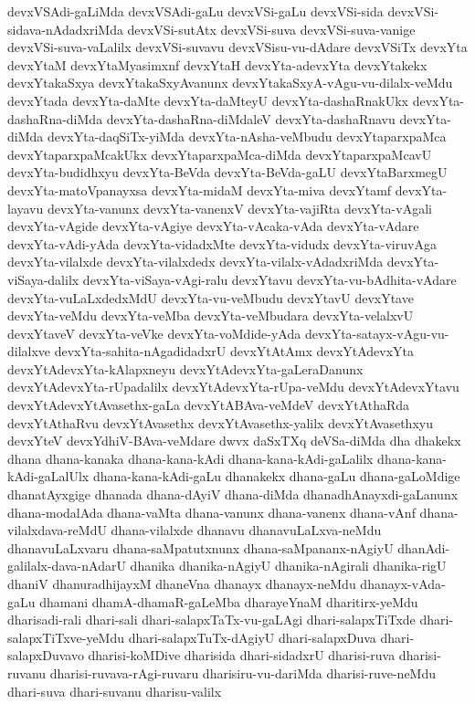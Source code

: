 {devxVSAdi-gaLiMda
devxVSAdi-gaLu
devxVSi-gaLu
devxVSi-sida
devxVSi-sidava-nAdadxriMda
devxVSi-sutAtx
devxVSi-suva
devxVSi-suva-vanige
devxVSi-suva-vaLalilx
devxVSi-suvavu
devxVSisu-vu-dAdare
devxVSiTx
devxYta
devxYtaM
devxYtaMyasimxnf
devxYtaH
devxYta-adevxYta
devxYtakekx
devxYtakaSxya
devxYtakaSxyAvanunx
devxYtakaSxyA-vAgu-vu-dilalx-veMdu
devxYtada
devxYta-daMte
devxYta-daMteyU
devxYta-dashaRnakUkx
devxYta-dashaRna-diMda
devxYta-dashaRna-diMdaleV
devxYta-dashaRnavu
devxYta-diMda
devxYta-daqSiTx-yiMda
devxYta-nAsha-veMbudu
devxYtaparxpaMca
devxYtaparxpaMcakUkx
devxYtaparxpaMca-diMda
devxYtaparxpaMcavU
devxYta-budidhxyu
devxYta-BeVda
devxYta-BeVda-gaLU
devxYtaBarxmegU
devxYta-matoVpanayxsa
devxYta-midaM
devxYta-miva
devxYtamf
devxYta-layavu
devxYta-vanunx
devxYta-vanenxV
devxYta-vajiRta
devxYta-vAgali
devxYta-vAgide
devxYta-vAgiye
devxYta-vAcaka-vAda
devxYta-vAdare
devxYta-vAdi-yAda
devxYta-vidadxMte
devxYta-vidudx
devxYta-viruvAga
devxYta-vilalxde
devxYta-vilalxdedx
devxYta-vilalx-vAdadxriMda
devxYta-viSaya-dalilx
devxYta-viSaya-vAgi-ralu
devxYtavu
devxYta-vu-bAdhita-vAdare
devxYta-vuLaLxdedxMdU
devxYta-vu-veMbudu
devxYtavU
devxYtave
devxYta-veMdu
devxYta-veMba
devxYta-veMbudara
devxYta-velalxvU
devxYtaveV
devxYta-veVke
devxYta-voMdide-yAda
devxYta-satayx-vAgu-vu-dilalxve
devxYta-sahita-nAgadidadxrU
devxYtAtAmx
devxYtAdevxYta
devxYtAdevxYta-kAlapxneyu
devxYtAdevxYta-gaLeraDanunx
devxYtAdevxYta-rUpadalilx
devxYtAdevxYta-rUpa-veMdu
devxYtAdevxYtavu
devxYtAdevxYtAvasethx-gaLa
devxYtABAva-veMdeV
devxYtAthaRda
devxYtAthaRvu
devxYtAvasethx
devxYtAvasethx-yalilx
devxYtAvasethxyu
devxYteV
devxYdhiV-BAva-veMdare
dwvx
daSxTXq
deVSa-diMda
dha
dhakekx
dhana
dhana-kanaka
dhana-kana-kAdi
dhana-kana-kAdi-gaLalilx
dhana-kana-kAdi-gaLalUlx
dhana-kana-kAdi-gaLu
dhanakekx
dhana-gaLu
dhana-gaLoMdige
dhanatAyxgige
dhanada
dhana-dAyiV
dhana-diMda
dhanadhAnayxdi-gaLanunx
dhana-modalAda
dhana-vaMta
dhana-vanunx
dhana-vanenx
dhana-vAnf
dhana-vilalxdava-reMdU
dhana-vilalxde
dhanavu
dhanavuLaLxva-neMdu
dhanavuLaLxvaru
dhana-saMpatutxnunx
dhana-saMpananx-nAgiyU
dhanAdi-galilalx-dava-nAdarU
dhanika
dhanika-nAgiyU
dhanika-nAgirali
dhanika-rigU
dhaniV
dhanuradhijayxM
dhaneVna
dhanayx
dhanayx-neMdu
dhanayx-vAda-gaLu
dhamani
dhamA-dhamaR-gaLeMba
dharayeYnaM
dharitirx-yeMdu
dharisadi-rali
dhari-sali
dhari-salapxTaTx-vu-gaLAgi
dhari-salapxTiTxde
dhari-salapxTiTxve-yeMdu
dhari-salapxTuTx-dAgiyU
dhari-salapxDuva
dhari-salapxDuvavo
dharisi-koMDive
dharisida
dhari-sidadxrU
dharisi-ruva
dharisi-ruvanu
dharisi-ruvava-rAgi-ruvaru
dharisiru-vu-dariMda
dharisi-ruve-neMdu
dhari-suva
dhari-suvanu
dharisu-valilx
}
